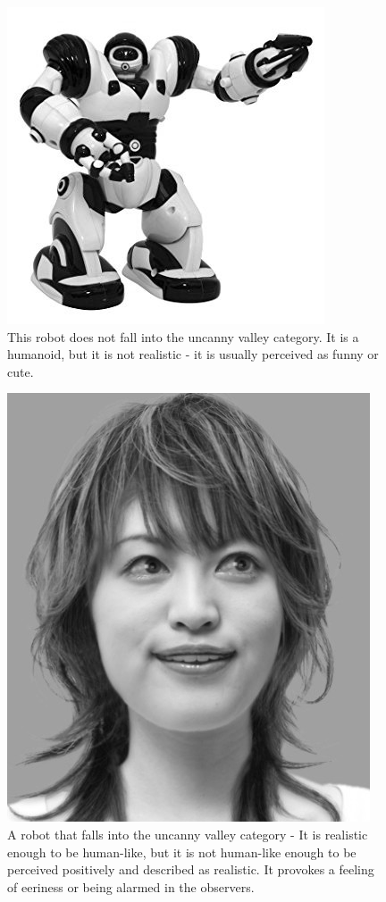 \begin{figure}[H]
\centerline{\includegraphics[scale=0.4]{img/toyrobot.jpg}}
\caption{This robot does not fall into the uncanny valley category. It is a humanoid, but it is not realistic - it is usually perceived as funny or cute.}\label{fig:toyrobot}
\end{figure}

\begin{figure}[H]
\centerline{\includegraphics[scale=0.4]{img/uncannyrobot.png}}
\caption{A robot that falls into the uncanny valley category - It is realistic enough to be human-like, but it is not human-like enough to be perceived positively and described as realistic. It provokes a feeling of eeriness or being alarmed in the observers.}\label{fig:uncannyrobot}
\end{figure}

